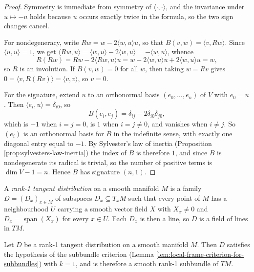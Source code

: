 \begin{proof}
\leanok
{}
Symmetry is immediate from symmetry of $\langle\cdot,\cdot\rangle$, and the invariance under $u \mapsto -u$ holds because $u$ occurs exactly twice in the formula, so the two sign changes cancel.

For nondegeneracy, write $R w = w - 2\langle w,u\rangle u$, so that $B(v,w) = \langle v, Rw\rangle$. Since $\langle u,u\rangle = 1$, we get $\langle Rw, u\rangle = \langle w,u\rangle - 2\langle w,u\rangle = -\langle w,u\rangle$, whence
\[
  R(Rw) = Rw - 2\langle Rw,u\rangle u = w - 2\langle w,u\rangle u + 2\langle w,u\rangle u = w,
\]
so $R$ is an involution. If $B(v,w) = 0$ for all $w$, then taking $w = Rv$ gives $0 = \langle v, R(Rv)\rangle = \langle v,v\rangle$, so $v = 0$.

For the signature, extend $u$ to an orthonormal basis $(e_0, \ldots, e_n)$ of $V$ with $e_0 = u$. Then $\langle e_i, u\rangle = \delta_{i0}$, so
\[
  B(e_i, e_j) = \delta_{ij} - 2\delta_{i0}\delta_{j0},
\]
which is $-1$ when $i = j = 0$, is $1$ when $i = j \neq 0$, and vanishes when $i \neq j$. So $(e_i)$ is an orthonormal basis for $B$ in the indefinite sense, with exactly one diagonal entry equal to $-1$. By Sylvester's law of inertia (Proposition \ref{prop:sylvesters-law-inertia}) the index of $B$ is therefore $1$, and since $B$ is nondegenerate its radical is trivial, so the number of positive terms is $\dim V - 1 = n$. Hence $B$ has signature $(n,1)$.
\end{proof}

\begin{definition}
\label{def:rank-one-distribution}
\leanok
A \emph{rank-1 tangent distribution} on a smooth manifold $M$ is a family $D = (D_x)_{x \in M}$ of subspaces $D_x \subseteq T_xM$ such that every point of $M$ has a neighbourhood $U$ carrying a smooth vector field $X$ with $X_x \neq 0$ and $D_x = \operatorname{span}(X_x)$ for every $x \in U$. Each $D_x$ is then a line, so $D$ is a field of lines in $TM$.
\end{definition}

\begin{proposition}
\label{prop:rank-one-distribution-is-subbundle}
\leanok
{}
Let $D$ be a rank-1 tangent distribution on a smooth manifold $M$. Then $D$ satisfies the hypothesis of the subbundle criterion (Lemma \ref{lem:local-frame-criterion-for-subbundles}) with $k = 1$, and is therefore a smooth rank-1 subbundle of $TM$.
\end{proposition}

